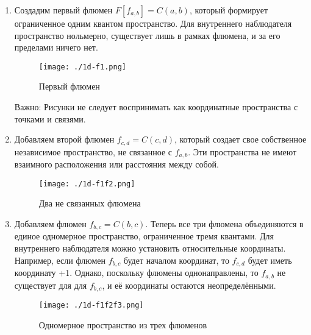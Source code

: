 \documentclass[final]{article}
\begin{document}
        \begin{enumerate}

            \item Создадим первый флюмен \( F[f_{a,b}]=C(a,b) \), который формирует 
            ограниченное одним квантом пространство. Для внутреннего наблюдателя 
            пространство нольмерно, существует лишь в рамках флюмена, и за его 
            пределами ничего нет.

            \begin{figure}[H]
                \centering
                \texttt{[image: ./1d-f1.png]}
                \caption{Первый флюмен}
                \label{fig:image}
            \end{figure}

            Важно: Рисунки не следует воспринимать как координатные пространства с точками
            и связями.

            \item Добавляем второй флюмен \( f_{c,d}=C(c,d) \), который создает свое 
            собственное независимое пространство, не связанное с \( f_{a,b} \). Эти 
            пространства не имеют взаимного расположения или расстояния между собой.

            \begin{figure}[H]
                \centering
                \texttt{[image: ./1d-f1f2.png]}
                \caption{Два не связанных флюмена}
                \label{fig:image}
            \end{figure}

            \item Добавляем флюмен \( f_{b,c}=C(b,c) \). Теперь все три флюмена 
            объединяются в единое одномерное пространство, ограниченное тремя 
            квантами. Для внутреннего наблюдателя можно установить относительные 
            координаты. Например, если флюмен \(f_{b,c}\) будет началом координат, 
            то \(f_{c,d}\) будет иметь координату +1. Однако, поскольку флюмены 
            однонаправлены, то \(f_{a,b}\) не существует для для \(f_{b,c}\), и её 
            координаты остаются неопределёнными.

            \begin{figure}[H]
                \centering
                \texttt{[image: ./1d-f1f2f3.png]}
                \caption{Одномерное пространство из трех флюменов}
                \label{fig:image}
            \end{figure}

        \end{enumerate}
\end{document}
